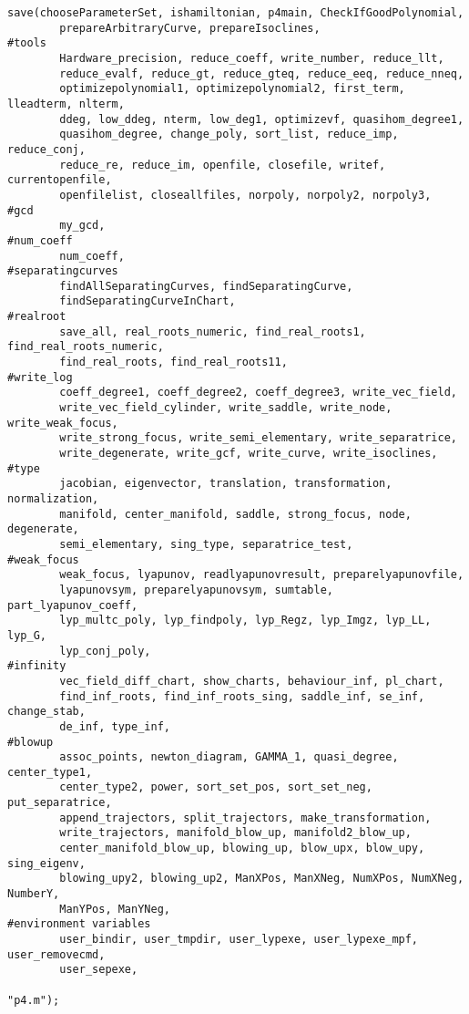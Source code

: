 \documentclass[a4paper,10pt]{article}
\begin{document}
\begin{lstlisting}[name=main]
save(chooseParameterSet, ishamiltonian, p4main, CheckIfGoodPolynomial,
        prepareArbitraryCurve, prepareIsoclines,
#tools
        Hardware_precision, reduce_coeff, write_number, reduce_llt,
        reduce_evalf, reduce_gt, reduce_gteq, reduce_eeq, reduce_nneq,
        optimizepolynomial1, optimizepolynomial2, first_term, lleadterm, nlterm,
        ddeg, low_ddeg, nterm, low_deg1, optimizevf, quasihom_degree1,
        quasihom_degree, change_poly, sort_list, reduce_imp, reduce_conj,
        reduce_re, reduce_im, openfile, closefile, writef, currentopenfile, 
        openfilelist, closeallfiles, norpoly, norpoly2, norpoly3,
#gcd
        my_gcd,
#num_coeff
        num_coeff,
#separatingcurves
        findAllSeparatingCurves, findSeparatingCurve,
        findSeparatingCurveInChart,
#realroot
        save_all, real_roots_numeric, find_real_roots1, find_real_roots_numeric,
        find_real_roots, find_real_roots11,
#write_log
        coeff_degree1, coeff_degree2, coeff_degree3, write_vec_field,
        write_vec_field_cylinder, write_saddle, write_node, write_weak_focus,
        write_strong_focus, write_semi_elementary, write_separatrice,
        write_degenerate, write_gcf, write_curve, write_isoclines,
#type
        jacobian, eigenvector, translation, transformation, normalization,
        manifold, center_manifold, saddle, strong_focus, node, degenerate,
        semi_elementary, sing_type, separatrice_test,
#weak_focus
        weak_focus, lyapunov, readlyapunovresult, preparelyapunovfile,
        lyapunovsym, preparelyapunovsym, sumtable, part_lyapunov_coeff,
        lyp_multc_poly, lyp_findpoly, lyp_Regz, lyp_Imgz, lyp_LL, lyp_G,
        lyp_conj_poly,
#infinity
        vec_field_diff_chart, show_charts, behaviour_inf, pl_chart,
        find_inf_roots, find_inf_roots_sing, saddle_inf, se_inf, change_stab,
        de_inf, type_inf,
#blowup
        assoc_points, newton_diagram, GAMMA_1, quasi_degree, center_type1,
        center_type2, power, sort_set_pos, sort_set_neg, put_separatrice,
        append_trajectors, split_trajectors, make_transformation,
        write_trajectors, manifold_blow_up, manifold2_blow_up,
        center_manifold_blow_up, blowing_up, blow_upx, blow_upy, sing_eigenv,
        blowing_upy2, blowing_up2, ManXPos, ManXNeg, NumXPos, NumXNeg, NumberY,
        ManYPos, ManYNeg,
#environment variables
        user_bindir, user_tmpdir, user_lypexe, user_lypexe_mpf, user_removecmd,
        user_sepexe,

"p4.m");
\end{lstlisting}
\end{document}
